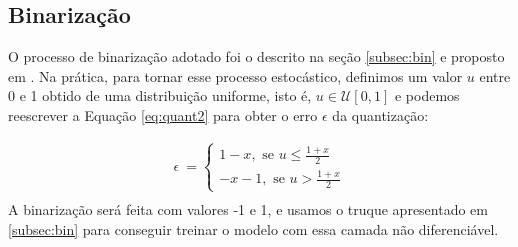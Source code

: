 \subsection{Binarização}

O processo de binarização adotado foi o descrito na seção \ref{subsec:bin} e proposto em \cite{Variable2016Toderici}.
Na prática, para tornar esse processo estocástico,  definimos um valor $u$ entre 0 e 1 obtido de uma distribuição uniforme, isto é,  $u \in \mathcal{U}[0,1]$ e podemos reescrever a Equação \ref{eq:quant2}  para obter o erro $\epsilon$ da quantização:

\begin{equation}
\label{eq:quant}
\begin{aligned}
\epsilon \ = \left\{
\begin{array}{ll}
1 - x, \text{ se $u$}  \leq \frac{1 + x}{2} \\
-x - 1, \text{ se $u$} > \frac{1 + x}{2}
\end{array}
\right. \\
\end{aligned}
\end{equation}
A binarização será feita com valores -1 e 1, e usamos o truque apresentado em \ref{subsec:bin} para conseguir treinar o modelo com essa camada não diferenciável. 









